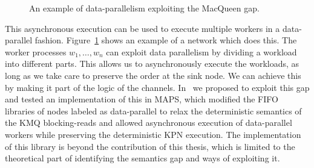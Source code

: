 \begin{figure}[h]
	\centering
   \resizebox{0.45\textwidth}{!}{}
	\caption{An example of data-parallelism exploiting the MacQueen gap.}
	\label{fig:data_parallel_kpn}
\end{figure}

This asynchronous execution can be used to execute multiple workers in a data-parallel fashion.
Figure~\ref{fig:data_parallel_kpn} shows an example of a network which does this.
The worker processes $w_1, \ldots, w_n$ can exploit data parallelism by dividing a workload into different parts.
This allows us to asynchronously execute the workloads, as long as we take care to preserve the order at the sink node. 
We can achieve this by making it part of the logic of the channels.
In~\cite{khasanov_parmaditam18} we proposed to exploit this gap and tested an implementation of this in \ac{MAPS}, which modified the FIFO libraries of nodes labeled as data-parallel to relax the deterministic semantics of the \ac{KMQ} blocking-reads and allowed asynchronous execution of data-parallel workers while preserving the deterministic \ac{KPN} execution.
The implementation of this library is beyond the contribution of this thesis, which is limited to the theoretical part of identifying the semantics gap and ways of exploiting it.  